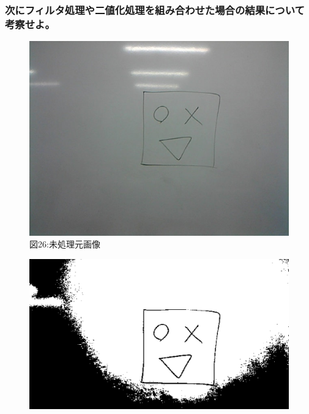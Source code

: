 ﻿\documentclass[a4j,11pt]{jarticle}
\begin{document}
\subsubsection{次にフィルタ処理や二値化処理を組み合わせた場合の結果について考察せよ。}
\clearpage
\begin{figure}[tb]

 \begin{minipage}{0.49\hsize} %
   \center
   \includegraphics[width=\hsize]{./eps/template-04-in.eps}
   図26:未処理元画像
 \end{minipage}
 \begin{minipage}{0.49\hsize} %
   \center
   \includegraphics[width=\hsize]{./eps/template-00-in.eps}


\end{minipage}
\end{figure}
\end{document}
